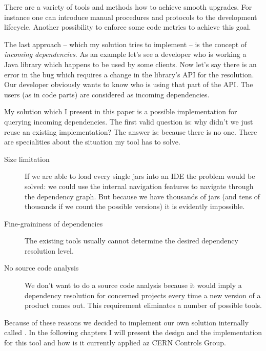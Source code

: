 There are a variety of tools and methods how to achieve smooth upgrades. For
instance one can introduce manual procedures and protocols to the development
lifecycle. Another possibility to enforce some code metrics to achieve this
goal.

The last approach -- which my solution tries to implement -- is the concept of
\emph{incoming dependencies}. As an example let's see a developer who is working
a Java library which happens to be used by some clients. Now let's say there is
an error in the bug which requires a change in the library's API for the
resolution. Our developer obviously wants to know who is using that part of the
API. The users (as in code parts) are considered as incoming dependencies.
 
My solution which I present in this paper is a possible implementation for
querying incoming dependencies. The first valid question is: why didn't we just
reuse an existing implementation? The answer is: because there is no one.
There are specialities about the situation my tool has to solve.
\begin{description}
\item[Size limitation] If we are able to load every single jars into an IDE the
problem would be solved: we could use the internal navigation features to navigate 
through the dependency graph. But because we have thousands of jars (and tens of 
thousands if we count the possible versions) it is evidently impossible.   
\item[Fine-graininess of dependencies] The existing tools usually cannot determine
 the desired dependency resolution level. 
\item[No source code analysis] We don't want to do a source code analysis because 
it would imply a dependency resolution for concerned projects every time a new version 
of a product comes out. This requirement eliminates a number of possible tools. 
\end{description}

Because of these reasons we decided to implement our own solution internally
called \ptool{}.
In the following chapters I will present the design and the implementation for
this tool and how is it currently applied az CERN Controls Group.

